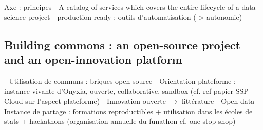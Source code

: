 Axe : principes
- A catalog of services which covers the entire lifecycle of a data science project
- production-ready : outils d'automatisation (-> autonomie)


\subsection{Building commons : an open-source project and an open-innovation platform}

- Utilisation de communs : briques open-source
- Orientation plateforme : instance vivante d'Onyxia, ouverte, collaborative, sandbox (cf. ref papier SSP Cloud sur l'aspect plateforme)
- Innovation ouverte $\rightarrow$ littérature
- Open-data
- Instance de partage : formations reproductibles + utilisation dans les écoles de stats + hackathons (organisation annuelle du funathon cf. one-stop-shop)
